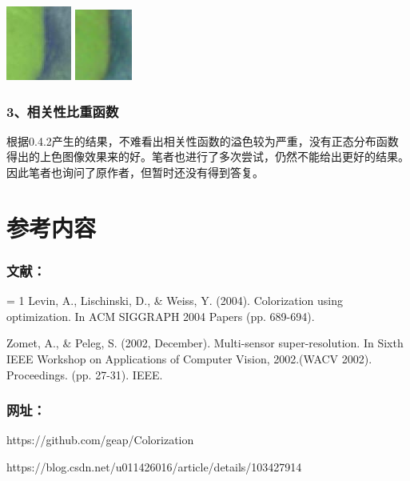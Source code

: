 \documentclass[12pt, a4paper, oneside]{report}
\begin{document}
	\centerline{
		\includegraphics[scale=3]{1.jpg}
		\includegraphics[scale=3.1]{2.png}}
	
	\subsubsection{3、相关性比重函数}
	
	根据0.4.2产生的结果，不难看出相关性函数的溢色较为严重，没有正态分布函数得出的上色图像效果来的好。笔者也进行了多次尝试，仍然不能给出更好的结果。因此笔者也询问了原作者，但暂时还没有得到答复。
	
	\section{参考内容}
	
	\subsubsection{文献：}
	
	\hangafter = 1
	\hangindent 0.5in
	\noindent 
	Levin, A., Lischinski, D., \& Weiss, Y. (2004). Colorization using optimization. In ACM SIGGRAPH 2004 Papers (pp. 689-694).
	
	\noindent Zomet, A., \& Peleg, S. (2002, December). Multi-sensor super-resolution. In Sixth IEEE Workshop on Applications of Computer Vision, 2002.(WACV 2002). Proceedings. (pp. 27-31). IEEE.
	
	\subsubsection{网址：}
	
	\noindent https://github.com/geap/Colorization
	
	\noindent https://blog.csdn.net/u011426016/article/details/103427914
	
\end{document}
